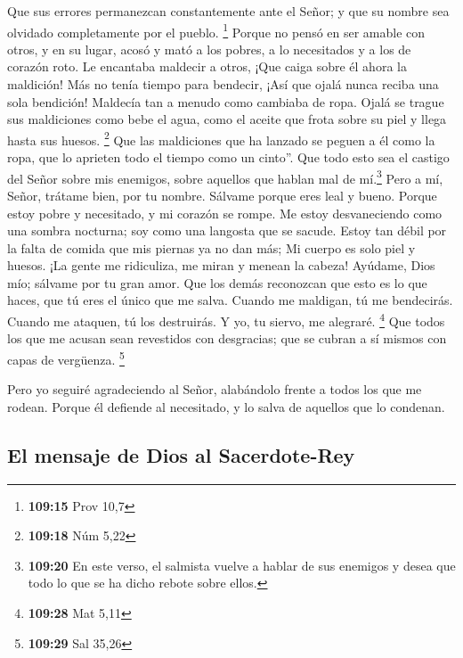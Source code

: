 Que sus errores permanezcan constantemente ante el Señor; y que su
nombre sea olvidado completamente por el pueblo. \footnote{\textbf{109:15}
  Prov 10,7}  Porque no pensó en ser amable con otros, y
en su lugar, acosó y mató a los pobres, a lo necesitados y a los de
corazón roto.  Le encantaba maldecir a otros, ¡Que caiga
sobre él ahora la maldición! Más no tenía tiempo para bendecir, ¡Así que
ojalá nunca reciba una sola bendición!  Maldecía tan a
menudo como cambiaba de ropa. Ojalá se trague sus maldiciones como bebe
el agua, como el aceite que frota sobre su piel y llega hasta sus
huesos. \footnote{\textbf{109:18} Núm 5,22}  Que las
maldiciones que ha lanzado se peguen a él como la ropa, que lo aprieten
todo el tiempo como un cinto''.  Que todo esto sea el
castigo del Señor sobre mis enemigos, sobre aquellos que hablan mal de
mí.\footnote{\textbf{109:20} En este verso, el salmista vuelve a hablar
  de sus enemigos y desea que todo lo que se ha dicho rebote sobre
  ellos.}  Pero a mí, Señor, trátame bien, por tu nombre.
Sálvame porque eres leal y bueno.  Porque estoy pobre y
necesitado, y mi corazón se rompe.  Me estoy
desvaneciendo como una sombra nocturna; soy como una langosta que se
sacude.  Estoy tan débil por la falta de comida que mis
piernas ya no dan más; Mi cuerpo es solo piel y huesos. 
¡La gente me ridiculiza, me miran y menean la cabeza! 
Ayúdame, Dios mío; sálvame por tu gran amor.  Que los
demás reconozcan que esto es lo que haces, que tú eres el único que me
salva.  Cuando me maldigan, tú me bendecirás. Cuando me
ataquen, tú los destruirás. Y yo, tu siervo, me alegraré. \footnote{\textbf{109:28}
  Mat 5,11}  Que todos los que me acusan sean revestidos
con desgracias; que se cubran a sí mismos con capas de vergüenza.
\footnote{\textbf{109:29} Sal 35,26}

 Pero yo seguiré agradeciendo al Señor, alabándolo frente
a todos los que me rodean.  Porque él defiende al
necesitado, y lo salva de aquellos que lo condenan.

\hypertarget{el-mensaje-de-dios-al-sacerdote-rey}{%
\subsection{El mensaje de Dios al
Sacerdote-Rey}\label{el-mensaje-de-dios-al-sacerdote-rey}}

